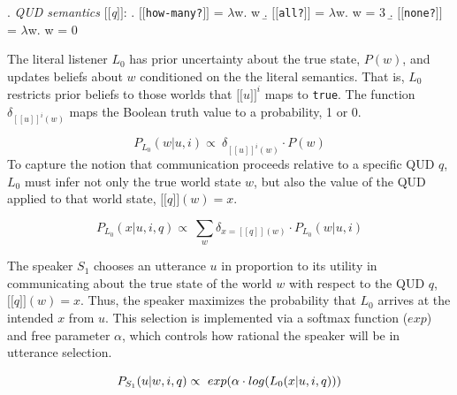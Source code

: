 \documentclass[10pt,a4paper]{article}
\newcommand{\sem}[1]{\mbox{$[\![$#1$]\!]$}}
\newcommand{\lam}{$\lambda$}
\newcommand{\kj}[1]{\textcolor{green}{[kj: #1]}}
\begin{document}
\ex. \label{ex:qud-sem} \emph{QUD semantics} \sem{\textit{q}}:
\a. \sem{\texttt{how-many?}} = \lam w. w
\b. \sem{\texttt{all?}} = \lam w. w = 3
\b. \sem{\texttt{none?}} = \lam w. w = 0


The literal listener $L_0$ has prior uncertainty about the true state, $P(w)$, and updates beliefs about $w$ conditioned on the the literal semantics.  That is, $L_0$ restricts prior beliefs to those worlds that $\sem{$u$}^i$ maps to \texttt{true}.  %
The function $\delta_{[\![u]\!]^{i}(w)}$ maps the Boolean truth value to a probability, 1 or 0.

\begin{equation*}
P_{L_{0}} (w | u, i) \propto \ \delta_{[\![u]\!]^{i}(w)} \cdot P(w)
\end{equation*}
To capture the notion that communication proceeds relative to a specific QUD $q$, $L_0$ must infer not only the true world state $w$, but also the value of the QUD applied to that world state, $\sem{$q$}(w) = x$.

\begin{equation*}
P_{L_{0}} (x | u, i, q) \propto \ \sum_{w}\delta_{x=[\! [ q ]\! ](w)} \cdot P_{L_{0}} (w | u, i)
\end{equation*}


The speaker $S_1$ chooses an utterance $u$ in proportion to its utility in communicating about the true state of the world $w$ with respect to the QUD $q$, $\sem{$q$}(w)=x$. Thus, the speaker maximizes the probability that $L_0$ arrives at the intended $x$ from $u$.
This selection is implemented via a softmax function ($exp$)  and free parameter 
$\alpha$, which controls how rational the speaker will be in utterance selection.  

\begin{equation*}
P_{S_{1}} (u | w, i, q) \propto  \ exp (\alpha \cdot log(L_{0}(x | u, i, q)))\\
\end{equation*}
\end{document}
